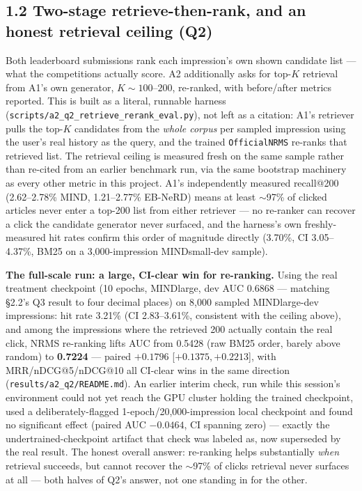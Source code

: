 \documentclass[11pt]{article}
\begin{document}
\subsection*{1.2 Two-stage retrieve-then-rank, and an honest retrieval ceiling (Q2)}

Both leaderboard submissions rank each impression's own shown candidate list ---
what the competitions actually score. A2 additionally asks for top-$K$ retrieval
from A1's own generator, $K\sim100$--$200$, re-ranked, with before/after metrics
reported. This is built as a literal, runnable harness
(\texttt{scripts/a2\_q2\_retrieve\_rerank\_eval.py}), not left as a citation:
A1's retriever pulls the top-$K$ candidates from the \emph{whole corpus} per
sampled impression using the user's real history as the query, and the trained
\texttt{OfficialNRMS} re-ranks that retrieved list. The retrieval ceiling is
measured fresh on the same sample rather than re-cited from an earlier
benchmark run, via the same bootstrap machinery as every other metric in this
project. A1's independently measured recall@200 (2.62--2.78\% MIND, 1.21--2.77\%
EB-NeRD) means at least $\sim$97\% of clicked articles never enter a top-200
list from either retriever --- no re-ranker can recover a click the candidate
generator never surfaced, and the harness's own freshly-measured hit rates
confirm this order of magnitude directly (3.70\%, CI 3.05--4.37\%, BM25 on a
3,000-impression MINDsmall-dev sample).

\textbf{The full-scale run: a large, CI-clear win for re-ranking.} Using the real
treatment checkpoint (10 epochs, MINDlarge, dev AUC 0.6868 --- matching \S2.2's
Q3 result to four decimal places) on 8,000 sampled MINDlarge-dev impressions:
hit rate 3.21\% (CI 2.83--3.61\%, consistent with the ceiling above), and among
the impressions where the retrieved 200 actually contain the real click, NRMS
re-ranking lifts AUC from 0.5428 (raw BM25 order, barely above random) to
\textbf{0.7224} --- paired $+0.1796$ [$+0.1375,+0.2213$], with MRR/nDCG@5/nDCG@10
all CI-clear wins in the same direction (\texttt{results/a2\_q2/README.md}). An
earlier interim check, run while this session's environment could not yet reach
the GPU cluster holding the trained checkpoint, used a deliberately-flagged
1-epoch/20,000-impression local checkpoint and found no significant effect
(paired AUC $-0.0464$, CI spanning zero) --- exactly the undertrained-checkpoint
artifact that check was labeled as, now superseded by the real result. The
honest overall answer: re-ranking helps substantially \emph{when} retrieval
succeeds, but cannot recover the $\sim$97\% of clicks retrieval never surfaces
at all --- both halves of Q2's answer, not one standing in for the other.
\end{document}

